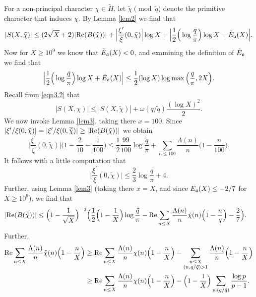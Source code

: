 \documentclass [12pt]{amsart}
\numberwithin{equation}{section}
\newcommand{\tRe}{\textup{Re}}
\begin{document}
For a non-principal character $\chi \in \tilde H$, 
let ${\tilde \chi} \pmod {\tilde q}$ denote the primitive character that induces $\chi$.  
By Lemma \ref{lem2} we find that 
\begin{equation}
\label{4.4} 
|S(X, \tilde \chi)| \le (2\sqrt{X}+2) |\tRe (B(\tilde \chi))| + \Big| \frac{\xi^{\prime}}{\xi}(0,
\tilde \chi)\Big| \log X + \Big| \frac12 \Big(\log \frac{\tilde q}{\pi}\Big) \log X + {\tilde E}_{\frak a}(X)\Big|.
\end{equation}
Now for $X\ge 10^9$  we know that $\tilde E_{\frak a}(X)<0$, and examining the 
 definition of ${\tilde E}_{\frak a}$ we find that 
\begin{equation} 
\label{4.41} 
\Big|\frac 12\Big(\log \frac{\tilde q}{\pi} \Big) \log X + {\tilde E}_{\frak a}(X)\Big| \le 
\frac 12 (\log X)\log \max\Big(\frac q{\pi},2X\Big).
\end{equation}
Recall from \eqref{eqn3.2} that 
\begin{equation} 
\label{4.5} 
|S(X,\chi)| \le |S(X,\tilde \chi)| + \omega(q/\tilde q) \frac{(\log X)^2}{2}. 
\end{equation}
We now invoke Lemma \ref{lem3}, taking there $x= 100$.  Since 
$|\xi^{\prime}/\xi(0,\tilde \chi)| = |\xi^{\prime}/\xi(0,\overline{\tilde \chi})| \ge |\tRe (B(\tilde \chi))|$ 
we obtain 
$$ 
\Big|\frac{\xi^{\prime}}{\xi}(0,\tilde \chi)\Big| \Big(1-\frac{2}{10} -\frac 1{100}\Big) 
\le \frac 12 \frac{99}{100} \log \frac{\tilde q}{\pi} + \sum_{n\le 100} \frac{\Lambda(n)}{n} \Big(1-\frac{n}{100}\Big).  
$$
It follows with a little computation that 
\begin{equation} 
\label{4.6} 
\Big| \frac{\xi^{\prime}}{\xi} (0,\tilde \chi) \Big| \le 
\frac{2}{3} \log \frac{  q}{\pi} + 4.
\end{equation}
Further, using Lemma \ref{lem3} (taking there $x=X$, and since $E_{\frak a}(X)\le -2/7$ for 
$X\ge 10^9$), we find that 
\begin{align*}
|\tRe (B(\tilde \chi))| 
&\le \Big(1-\frac{1}{\sqrt{X}}\Big)^{-2} \Big( \frac 12\Big(1-\frac 1X\Big) \log \frac{\tilde q}{\pi} - 
\tRe \sum_{n\le X} \frac{\Lambda(n)}{n} \tilde \chi(n) \Big(1-\frac nq\Big) -\frac 27 \Big). 
\end{align*} 
Further, 
\begin{align*}
\tRe \sum_{n\le X} \frac{\Lambda(n)}{n} 
\tilde \chi(n)\Big(1-\frac nX\Big) &\ge 
\tRe \sum_{n\le X} \frac{\Lambda(n)}{n} 
 \chi(n) \Big(1-\frac nX\Big) - \sum_{\substack{ n\le X \\ (n,q/\tilde q)>1}} 
\frac{\Lambda(n)}{n} \Big(1-\frac{n}{X}\Big)\\
&\ge \tRe \sum_{n\le X} \frac{\Lambda(n)}{n} 
 \chi(n) \Big(1-\frac nX\Big) - \Big(1-\frac 1X\Big) \sum_{p|(q/\tilde q)} \frac{\log p}{p-1}.
\end{align*} 
\end{document}
